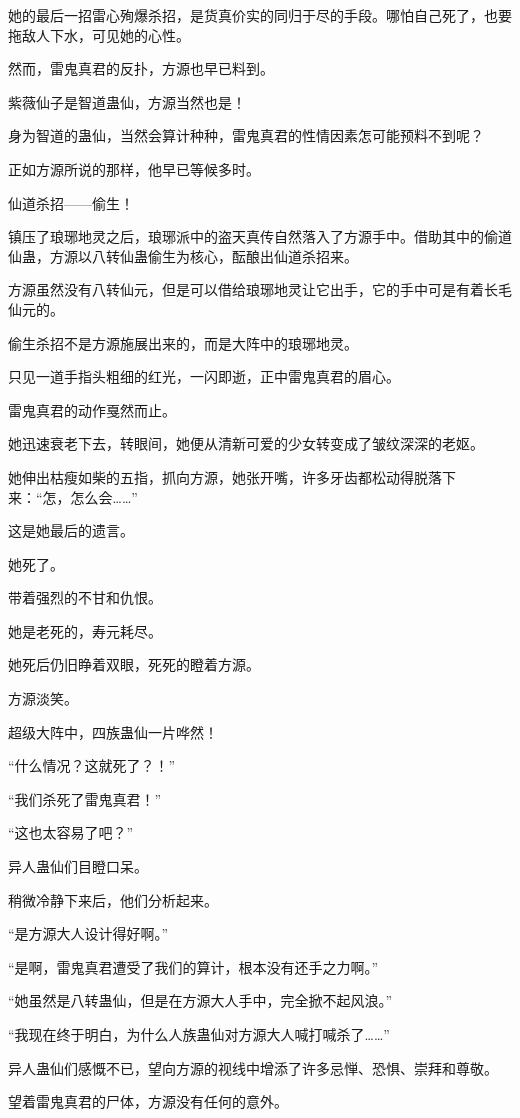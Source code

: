 \begin{this_body}
她的最后一招雷心殉爆杀招，是货真价实的同归于尽的手段。哪怕自己死了，也要拖敌人下水，可见她的心性。

然而，雷鬼真君的反扑，方源也早已料到。

紫薇仙子是智道蛊仙，方源当然也是！

身为智道的蛊仙，当然会算计种种，雷鬼真君的性情因素怎可能预料不到呢？

正如方源所说的那样，他早已等候多时。

仙道杀招——偷生！

镇压了琅琊地灵之后，琅琊派中的盗天真传自然落入了方源手中。借助其中的偷道仙蛊，方源以八转仙蛊偷生为核心，酝酿出仙道杀招来。

方源虽然没有八转仙元，但是可以借给琅琊地灵让它出手，它的手中可是有着长毛仙元的。

偷生杀招不是方源施展出来的，而是大阵中的琅琊地灵。

只见一道手指头粗细的红光，一闪即逝，正中雷鬼真君的眉心。

雷鬼真君的动作戛然而止。

她迅速衰老下去，转眼间，她便从清新可爱的少女转变成了皱纹深深的老妪。

她伸出枯瘦如柴的五指，抓向方源，她张开嘴，许多牙齿都松动得脱落下来：“怎，怎么会……”

这是她最后的遗言。

她死了。

带着强烈的不甘和仇恨。

她是老死的，寿元耗尽。

她死后仍旧睁着双眼，死死的瞪着方源。

方源淡笑。

超级大阵中，四族蛊仙一片哗然！

“什么情况？这就死了？！”

“我们杀死了雷鬼真君！”

“这也太容易了吧？”

异人蛊仙们目瞪口呆。

稍微冷静下来后，他们分析起来。

“是方源大人设计得好啊。”

“是啊，雷鬼真君遭受了我们的算计，根本没有还手之力啊。”

“她虽然是八转蛊仙，但是在方源大人手中，完全掀不起风浪。”

“我现在终于明白，为什么人族蛊仙对方源大人喊打喊杀了……”

异人蛊仙们感慨不已，望向方源的视线中增添了许多忌惮、恐惧、崇拜和尊敬。

望着雷鬼真君的尸体，方源没有任何的意外。


\end{this_body}
